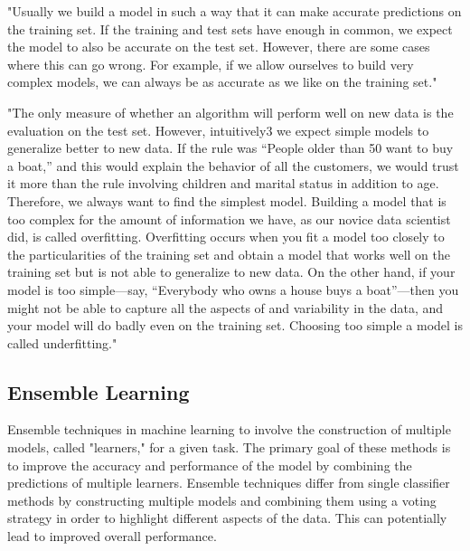 "Usually we build a model in such a way that it can make accurate
predictions on the training set. If the training and test sets have
enough in common, we expect the model to also be accurate on the test
set. However, there are some cases where this can go wrong. For example,
if we allow ourselves to build very complex models, we can always be as
accurate as we like on the training set." 
\cite[p. 35]{muller_introductionmachinelearning_2016}

"The only measure of whether an algorithm will perform well on new data
is the evaluation on the test set. However, intuitively3 we expect simple models to generalize
better to new data. If the rule was “People older than 50 want to buy a
boat,” and this would explain the behavior of all the
customers, we would trust it more than the rule involving children and
marital status in addition to age. Therefore, we always want to find
the simplest model. Building a model that is too complex for the amount
of information we have, as our novice data scientist did, is called
overfitting. Overfitting occurs when you fit a model too closely to
the particularities of the training set and obtain a model that works
well on the training set but is not able to generalize to new data. On
the other hand, if your model is too simple—say, “Everybody who owns a
house buys a boat”—then you might not be able to capture all the
aspects of and variability in the data, and your model will do badly even
on the training set. Choosing too simple a model is called
underfitting."  \cite[p. 35]{muller_introductionmachinelearning_2016}






\subsection{Ensemble Learning}
Ensemble techniques in machine learning to involve the construction of multiple models, called "learners," for a given task. The primary goal of these methods is to improve the accuracy and performance of the model by combining the predictions of multiple learners. Ensemble techniques differ from single classifier methods by constructing multiple models and combining them using a voting strategy in order to highlight different aspects of the data. This can potentially lead to improved overall performance. \cite[p. 253]{shaik_briefsurveyrandom_2019}


